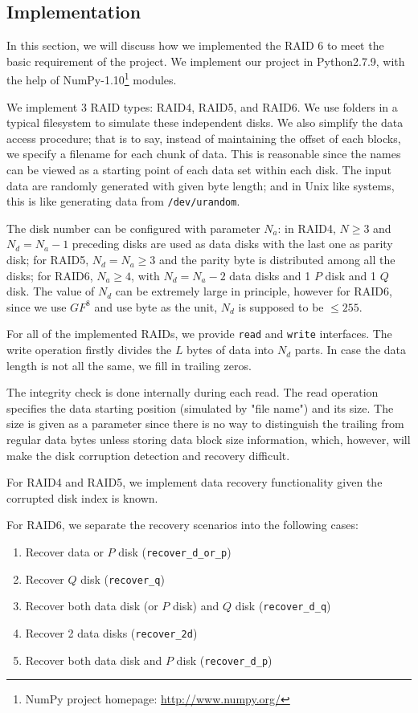 \subsection{Implementation}

In this section, we will discuss how we implemented the RAID 6 to meet the basic requirement of the project.
We implement our project in Python2.7.9, with the help of NumPy-1.10\footnote{NumPy project homepage: \url{http://www.numpy.org/}} modules.

We implement 3 RAID types: RAID4, RAID5, and RAID6. We use folders in a typical filesystem to simulate these independent disks. We also simplify the data access procedure; that is to say, instead of maintaining the offset of each blocks, we specify a filename for each chunk of data. This is reasonable since the names can be viewed as a starting point of each data set within each disk. The input data are randomly generated with given byte length; and in Unix like systems, this is like generating data from \verb|/dev/urandom|.

The disk number can be configured with parameter $N_{a}$: in RAID4, $N\ge 3$ and $N_{d}=N_{a}-1$ preceding disks are used as data disks with the last one as parity disk; for RAID5, $N_{d}=N_{a}\ge 3$ and the parity byte is distributed among all the disks;  for RAID6, $N_{a}\ge 4$, with $N_{d}=N_{a}-2$ data disks and 1 $P$ disk and 1 $Q$ disk. The value of $N_{d}$ can be extremely large in principle, however for RAID6, since we use $GF^8$ and use byte as the unit, $N_{d}$ is supposed to be $\le 255$.

For all of the implemented RAIDs, we provide \verb|read| and \verb|write| interfaces. The write operation firstly divides the $L$ bytes of data into $N_d$ parts. In case the data length is not all the same, we fill in trailing zeros. 

The integrity check is done internally during each read. The read operation specifies the data starting position (simulated by "file name") and its size. The size is given as a parameter since there is no way to distinguish the trailing from regular data bytes unless storing data block size information, which, however, will make the disk corruption detection and recovery difficult.

For RAID4 and RAID5, we implement data recovery functionality given the corrupted disk index is known. 

For RAID6, we separate the recovery scenarios into the following cases:

\begin{enumerate}
	\item\label{itm:r_d_OR_p} Recover data or $P$ disk (\verb|recover_d_or_p|)
	\item \label{itm:r_q} Recover $Q$ disk (\verb|recover_q|)
	\item \label{itm:r_d_q} Recover both data disk (or $P$ disk) and $Q$ disk (\verb|recover_d_q|)
	\item \label{itm:r_2d} Recover 2 data disks (\verb|recover_2d|)
	\item \label{itm:r_d_p} Recover both data disk and $P$ disk (\verb|recover_d_p|)
\end{enumerate}

